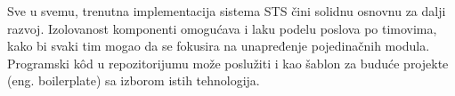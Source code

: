 \documentclass[12pt,oneside]{memoir}
\begin{document}
Sve u svemu, trenutna implementacija sistema STS čini solidnu osnovnu za dalji razvoj. Izolovanost komponenti omogućava i laku podelu poslova po timovima, kako bi svaki tim mogao da se fokusira na unapređenje pojedinačnih modula. Programski k\^{o}d u repozitorijumu može poslužiti i kao šablon za buduće projekte (eng. boilerplate) sa izborom istih tehnologija.
\literatura

\backmatter

\begin{biografija}

\end{biografija}
\end{document}

